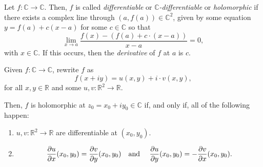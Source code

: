 
\begin{defn}
	Let $f : \mathbb{C} \to \mathbb{C}$. Then, $f$ is called \emph{differentiable} or \emph{$\mathbb{C}$-differentiable} or \emph{holomorphic} if there exists a complex line through $(a, f(a)) \in \mathbb{C}^2$, given by some equation $y = f(a) + c(x-a)$ for some $c\in \mathbb{C}$ so that \[
		\lim_{x \to a} \frac{f(x) - \left( f(a) + c \cdot (x-a) \right)}{x-a} = 0,
	\]
	with $x \in \mathbb{C}$. If this occurs, then the \emph{derivative} of $f$ at $a$ is $c$.
\end{defn}

\begin{thm}
	Given $f : \mathbb{C} \to \mathbb{C}$, rewrite $f$ as \[
		f(x + iy) = u(x, y) + i\cdot v(x, y),
	\]
	for all $x, y \in \mathbb{R}$ and some $u, v: \mathbb{R}^2 \to \mathbb{R}$. 

	Then, $f$ is holomorphic at $z_0 = x_0 + iy_0 \in \mathbb{C}$ if, and only if, all of the following happen:
	\begin{enumerate}[label = (\textit{\roman*})]
		\item $u, v : \mathbb{R}^2 \to \mathbb{R}$ are differentiable at $(x_0, y_0)$.
		\item \[\frac{\partial u}{\partial x} (x_0, y_0) = \frac{\partial v}{\partial y} (x_0, y_0) \text{\quad and \quad}
			\frac{\partial u}{\partial y} (x_0, y_0) = -\frac{\partial v}{\partial x} (x_0, y_0).\]
	\end{enumerate}
\end{thm}
